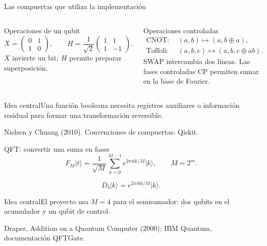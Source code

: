 \documentclass[aspectratio=169,12pt]{beamer}
\newcommand{\ket}[1]{\lvert #1\rangle}
\newcommand{\fuente}[1]{\vfill{\color{gris}\tiny #1\par}}
\newcommand{\idea}[1]{\begin{alertblock}{Idea central}#1\end{alertblock}}
\begin{document}
\begin{frame}[shrink=0]{Las compuertas que utiliza la implementación}
\small
\begin{columns}[T,onlytextwidth]
\begin{block}{Operaciones de un qubit}
\small
\[
X=\begin{pmatrix}0&1\\1&0\end{pmatrix},\qquad
H=\frac1{\sqrt2}\begin{pmatrix}1&1\\1&-1\end{pmatrix}.
\]
\small $X$ invierte un bit; $H$ permite preparar superposición.
\end{block}
\begin{block}{Operaciones controladas}
\begin{align*}
\mathrm{CNOT}:\;&(a,b)\mapsto(a,b\oplus a),\\
\mathrm{Toffoli}:\;&(a,b,c)\mapsto(a,b,c\oplus ab).
\end{align*}
\small SWAP intercambia dos líneas. Las fases controladas CP permiten sumar en la base de Fourier.
\end{block}
\end{columns}
\idea{Una función booleana necesita registros auxiliares o información residual
para formar una transformación reversible.}
\fuente{Nielsen y Chuang (2010). Convenciones de compuertas: Qiskit.}
\end{frame}

\begin{frame}{QFT: convertir una suma en fases}
\[
F_M\ket t=\frac1{\sqrt M}\sum_{k=0}^{M-1}e^{2\pi i tk/M}\ket k,
\qquad M=2^m.
\]
\vspace{1mm}
\begin{center}
\end{center}
\[
D_b\ket k=e^{2\pi i bk/M}\ket k.
\]
\idea{El proyecto usa $M=4$ para el semisumador: dos qubits en el acumulador
y un qubit de control.}
\fuente{Draper, Addition on a Quantum Computer (2000); IBM Quantum, documentación QFTGate.}
\end{frame}
\end{document}
